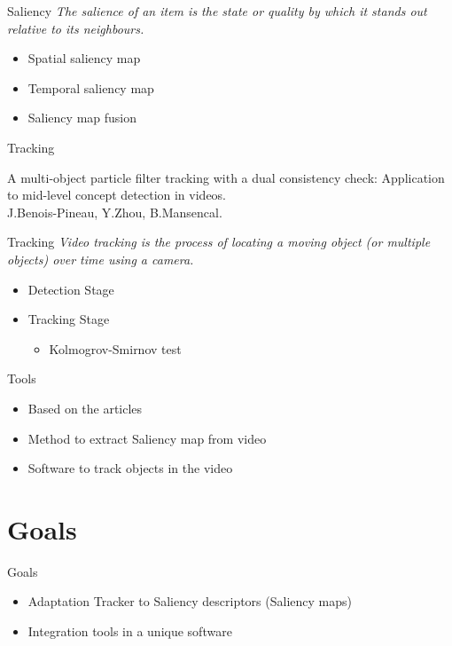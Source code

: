\documentclass[t,14pt]{beamer}
\begin{document}
\begin{frame}{Saliency}
\vspace{5mm}
\textit{The salience of an item is the state or quality by which it stands out relative to its neighbours.}
\vspace{5mm}
\begin{itemize}[<+->]
\item Spatial saliency map
\item Temporal saliency map
\item Saliency map fusion
\end{itemize}
\end{frame}

\begin{frame}{Tracking}
\vspace{5mm}
\begin{center}
A multi-object particle filter tracking with a dual consistency check: Application to mid-level concept detection in videos. \\
\vspace{5mm}
J.Benois-Pineau, Y.Zhou, B.Mansencal.
\end{center}
\end{frame}

\begin{frame}{Tracking}
\vspace{5mm}
\textit{Video tracking is the process of locating a moving object (or multiple objects) over time using a camera.}
\begin{itemize}[<+->]
\item Detection Stage
\item Tracking Stage
\begin{itemize}
	\item Kolmogrov-Smirnov test
\end{itemize}
\end{itemize}
\end{frame}

\begin{frame}{Tools}
\vspace{5mm}
\begin{itemize}[<+->]
\item Based on the articles
\item Method to extract Saliency map from video
\item Software to track objects in the video
\end{itemize}
\end{frame}

\section[Goals]{Goals}
\vspace{5mm}
\begin{frame}{Goals}
\vspace{5mm}
\begin{itemize}[<+->]
\item Adaptation Tracker to Saliency descriptors (Saliency maps)
\item Integration tools in a unique software
\end{itemize}
\end{frame}
\end{document}
